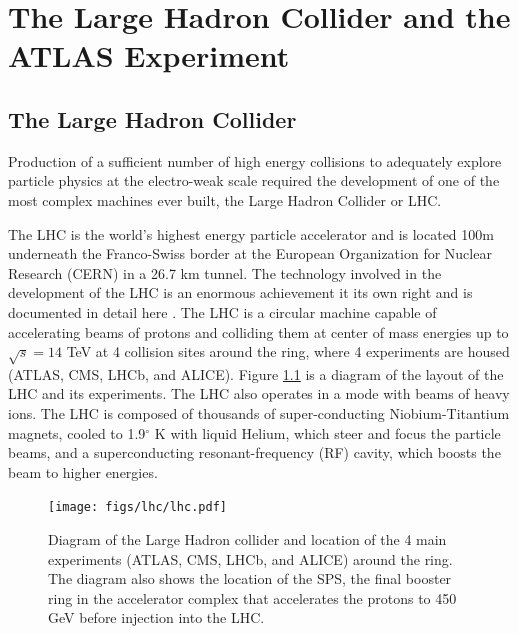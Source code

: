 \chapter[The Large Hadron Collider and the ATLAS Experiment][The Large Hadron Collider and the ATLAS Experiment]{The Large Hadron Collider and the ATLAS Experiment}
\label{chapter:lhc}
\section{The Large Hadron Collider}


Production of a sufficient number of high energy collisions to adequately explore
particle physics at the electro-weak scale required the development of one
of the most complex machines ever built, the Large Hadron Collider or LHC. 

The LHC is the world's highest energy particle accelerator 
and is located 100m underneath the Franco-Swiss border at the European Organization
for Nuclear Research (CERN) in a 26.7 km tunnel. The technology involved in the development of the LHC is an enormous achievement
it its own right and is documented in detail here \cite{1748-0221-3-08-S08001,Pettersson:291782,Linnecar:1176380}. 
The LHC is a circular machine capable of accelerating beams of protons and colliding them at center of mass 
energies up to $\sqrt{s} = 14$ TeV at 4 collision sites around the ring, where 4 experiments
are housed (ATLAS\cite{ATLAS_detector}, CMS\cite{1748-0221-3-08-S08004}, LHCb\cite{1748-0221-3-08-S08005}, and ALICE\cite{1748-0221-3-08-S08002}). Figure \ref{figure:lhc_lhc} is a diagram
of the layout of the LHC and its experiments\cite{Team:40525}. The LHC also operates in a mode with beams of 
heavy ions. The LHC is composed of thousands of super-conducting Niobium-Titantium 
magnets, cooled to 1.9$^\circ$ K with liquid Helium, which steer and focus the 
particle beams, and a superconducting resonant-frequency (RF) cavity, which boosts the beam
to higher energies. 

\begin{figure}[!t]
\centering 
\texttt{[image: figs/lhc/lhc.pdf]}
\caption{ Diagram of the Large Hadron collider and location of the 4 main experiments (ATLAS, CMS, LHCb, and ALICE) around
  the ring. The diagram also shows the location of the SPS, the final booster ring in the accelerator complex that accelerates
    the protons to 450 GeV before injection into the LHC. 
}
\label{figure:lhc_lhc}
\end{figure}




